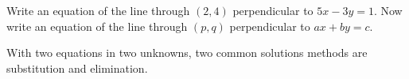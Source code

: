 \documentclass[nooutcomes]{ximera}
\begin{document}
\begin{problem}
Write an equation of the line through $(2,4)$ perpendicular to $5x-3y=1$.  
Now write an equation of the line through $(p,q)$ perpendicular to $ax+by=c$. 
\end{problem}


%
%
%
%
With two equations in two unknowns, two common solutions methods are substitution and elimination.  
\end{document}
